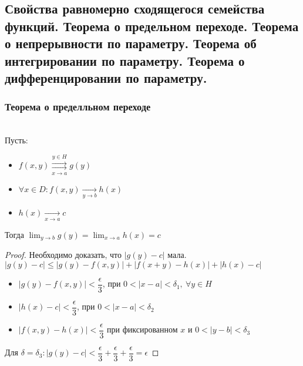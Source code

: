 \subsection{Свойства равномерно сходящегося семейства функций. Теорема о предельном переходе. Теорема о непрерывности по параметру. Теорема об интегрировании по параметру. Теорема о дифференцировании по параметру.}

\subsubsection{Теорема о пределльном переходе}

\begin{theorem*} \ \\
    Пусть: 
    \begin{itemize}
        \item $f(x, y) \overset{y \in H}{\underset{x \to a}{\rightrightarrows}} g(y)$
        \item $\forall x \in D: f(x, y) \underset{y \to b}{\to} h(x)$
        \item $h(x) \underset{x \to a}{\to} c$
    \end{itemize}  
    Тогда $\displaystyle \lim_{y \to b} g(y) = \lim_{x \to a} h(x) = c$
\end{theorem*}
\begin{proof}
    Необходимо доказать, что $|g(y) - c|$ мала. \\
    $|g(y) - c| \leqslant |g(y) - f(x, y)| + |f(x + y) - h(x)| + |h(x) - c|$ \\
    \begin{itemize}
        \item $|g(y) - f(x, y)| < \dfrac{\epsilon}{3}$, при $ 0 < |x - a| < \delta_1, \ \forall y \in H$
        \item $|h(x) - c| < \dfrac{\epsilon}{3}$, при $0 < |x - a| < \delta_2$
        \item $|f(x, y) - h(x)| < \dfrac{\epsilon}{3}$ при фиксированном
         $x$ и  $0 < |y - b| < \delta_3$
    \end{itemize}  
    Для $\delta = \delta_3: |g(y) - c| < \dfrac{\epsilon}{3} + 
    \dfrac{\epsilon}{3} +  \dfrac{\epsilon}{3} = \epsilon$
\end{proof}
